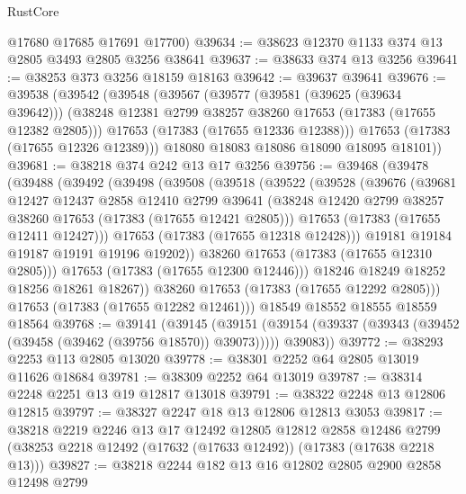 \begin{lexlean}{RustCore}
\begin{coremodule}
      @17680
      @17685
      @17691
      @17700)
@39634 := @38623 @12370 @1133 @374 @13 @2805 @3493 @2805 @3256 @38641
@39637 := @38633 @374 @13 @3256
@39641 := @38253 @373 @3256 @18159 @18163
@39642 := @39637 @39641
@39676 := @39538
    (@39542
      (@39548
        (@39567
          (@39577
            (@39581 (@39625 (@39634 @39642)))
            (@38248 @12381 @2799 @38257 @38260 @17653 (@17383 (@17655 @12382 @2805)))
            @17653
            (@17383 (@17655 @12336 @12388)))
          @17653
          (@17383 (@17655 @12326 @12389)))
        @18080
        @18083
        @18086
        @18090
        @18095
        @18101))
@39681 := @38218 @374 @242 @13 @17 @3256
@39756 := @39468
    (@39478
      (@39488
        (@39492
          (@39498
            (@39508
              (@39518
                (@39522
                  (@39528
                    (@39676
                      (@39681
                        @12427
                        @12437
                        @2858
                        @12410
                        @2799
                        @39641
                        (@38248 @12420 @2799 @38257 @38260 @17653 (@17383 (@17655 @12421 @2805)))
                        @17653
                        (@17383 (@17655 @12411 @12427)))
                      @17653
                      (@17383 (@17655 @12318 @12428)))
                    @19181
                    @19184
                    @19187
                    @19191
                    @19196
                    @19202))
                @38260
                @17653
                (@17383 (@17655 @12310 @2805)))
              @17653
              (@17383 (@17655 @12300 @12446)))
            @18246
            @18249
            @18252
            @18256
            @18261
            @18267))
        @38260
        @17653
        (@17383 (@17655 @12292 @2805)))
      @17653
      (@17383 (@17655 @12282 @12461)))
    @18549
    @18552
    @18555
    @18559
    @18564
@39768 := @39141
    (@39145
      (@39151 (@39154 (@39337 (@39343 (@39452 (@39458 (@39462 (@39756 @18570)) @39073))))) @39083))
@39772 := @38293 @2253 @113 @2805 @13020
@39778 := @38301 @2252 @64 @2805 @13019 @11626 @18684
@39781 := @38309 @2252 @64 @13019
@39787 := @38314 @2248 @2251 @13 @19 @12817 @13018
@39791 := @38322 @2248 @13 @12806 @12815
@39797 := @38327 @2247 @18 @13 @12806 @12813 @3053
@39817 := @38218
    @2219
    @2246
    @13
    @17
    @12492
    @12805
    @12812
    @2858
    @12486
    @2799
    (@38253 @2218 @12492 (@17632 (@17633 @12492)) (@17383 (@17638 @2218 @13)))
@39827 := @38218 @2244 @182 @13 @16 @12802 @2805 @2900 @2858 @12498 @2799

\end{coremodule}
\end{lexlean}
